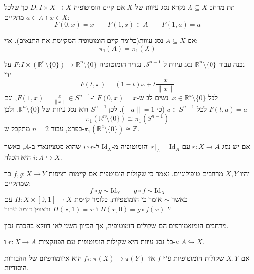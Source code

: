 \documentclass{tstextbook}
\begin{document}
\begin{definition}
תת מרחב \(A\subseteq X\) נקרא נסג עיוות של \(X\) אם קיים הומוטופיה \(D:I\times X\to X\) כך שלכל \(x \in X\) ו-\(a \in A\) מתקיים:
$$F(0,x)=x\qquad F(1,x)\in A\qquad F(1,a)=a$$

\end{definition}
\begin{proposition}
אם \(A\subseteq X\) נסג עיוות(כלומר קיים הומוטופיה המקיימת את התנאים). אזי:
$$\pi_{1}(A)=\pi_{1}(X)$$

\end{proposition}
\begin{example}
נבנה עבור \(\mathbb{R}^n \setminus \{0\}\) נסג עיוות ל-\(S^{n-1}\). נגדיר הומוטופיה \(F : I \times (\mathbb{R}^n \setminus \{0\}) \to \mathbb{R}^n \setminus \{0\}\) על ידי
$$F(t, x) = (1-t)x + t\frac{x}{\|x\|}$$
לכל \(x \in \mathbb{R}^n \setminus \{0\}\). נשים לב ש-\(F(0, x) = x\) ו-\(F(1, x) = \frac{x}{\|x\|} \in S^{n-1}\), וגם \(F(t, a) = a\) לכל \(a \in S^{n-1}\) (כי \(\|a\|=1\)). לכן \(S^{n-1}\) הוא נסג עיוות של \(\mathbb{R}^n \setminus \{0\}\), ולכן
$$\pi_1(\mathbb{R}^n \setminus \{0\}) \cong \pi_1(S^{n-1})$$
בפרט, עבור \(n=2\) מתקבל ש-\(\pi_1(\mathbb{R}^2 \setminus \{0\}) \cong \mathbb{Z}\).

\end{example}
\begin{proposition}
אם יש נסג \(r:X\to A\) עם \(r|_{A}=\mathrm{Id}_{A}\) והומוטופיה מ-\(\mathrm{Id}_{X}\) ל-\(i\circ r\) שהוא סטציונארי ב-\(A\), כאשר \(i:A \hookrightarrow X\) היא הכלה.

\end{proposition}
\begin{definition}
יהיו \(X,Y\) מרחבים טופולוגיים. נאמר כי שקולות הומוטפית אם קיימות רציפות \(f,g:X\to Y\) כך שמתקיים:
$$f\circ  g \sim  \mathrm{Id}_{Y}\qquad g\circ  f \sim  \mathrm{Id}_{X}$$
כאשר \(\sim\) אומר כי הומוטפיות, כלומר קיימת \(H:X\times[0,1]\to X\) עם \(H(x,0)=g\circ f(x)\) ו-\(H(x,1)=x\) ובאופן דומה עבור \(Y\).

\end{definition}
\begin{remark}
מרחבים הומואמורפים הם שקולים הומוטופית, אך הכיוון השני לאי דווקא בהכרח נכון.

\end{remark}
\begin{remark}
כל נסג עיוות היא שקילות הומוטופית עם הפונקציות \(r:X\to A\) ו-\(\iota:A\hookrightarrow X\). 

\end{remark}
\begin{proposition}
אם \(X,Y\) שקולות הומוטופיות ע"י \(f\) אזי \(f_{*}:\pi(X)\to \pi(Y)\) הוא איזומורפיזם של החבורות היסודיות.

\end{proposition}
\end{document}
